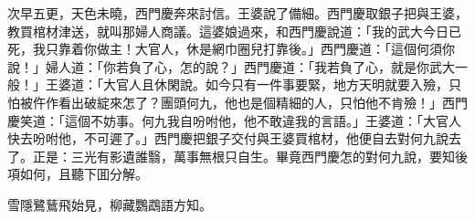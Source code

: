 次早五更，天色未曉，西門慶奔來討信。王婆說了備細。西門慶取銀子把與王婆，教買棺材津送，就叫那婦人商議。這婆娘過來，和西門慶說道：「我的武大今日已死，我只靠着你做主！大官人，休是網巾圈兒打靠後。」西門慶道：「這個何須你說！」婦人道：「你若負了心，怎的說？」西門慶道：「我若負了心，就是你武大一般！」王婆道：「大官人且休閑說。如今只有一件事要緊，地方天明就要入殮，只怕被仵作看出破綻來怎了？團頭何九，他也是個精細的人，只怕他不肯殮！」西門慶笑道：「這個不妨事。何九我自吩咐他，他不敢違我的言語。」王婆道：「大官人快去吩咐他，不可遲了。」西門慶把銀子交付與王婆買棺材，他便自去對何九說去了。正是：三光有影遺誰翳，萬事無根只自生。畢竟西門慶怎的對何九說，要知後項如何，且聽下囬分解。
\begin{myquote}
雪隱鷺鶿飛始見，柳藏鸚鵡語方知。
\end{myquote}

